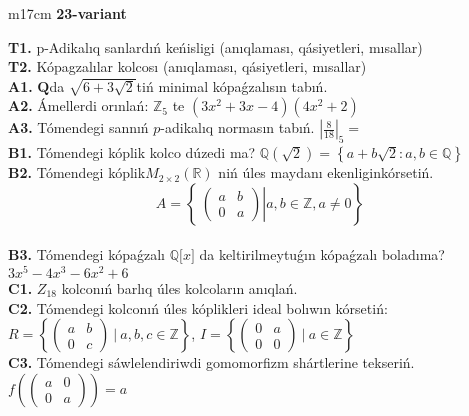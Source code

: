\documentclass{article}
\begin{document}
\begin{tabular}{m{17cm}}
\textbf{23-variant}
\newline

\textbf{T1.} p-Adikalıq sanlardıń keńisligi (anıqlaması, qásiyetleri, mısallar) \\
\textbf{T2.} Kópagzalılar kolcosı (anıqlaması, qásiyetleri, mısallar) \\
\textbf{A1.} \(\mathbf{Q}\)da \(\sqrt{6 + 3\sqrt{2}}\)tiń minimal kópaǵzalısın tabıń. \\
\textbf{A2.} Ámellerdi orınlań: \(\mathbb{Z}_{5}\) te \(\left( 3x^{2} + 3x - 4 \right)\left( 4x^{2} + 2 \right)\) \\
\textbf{A3.} Tómendegi sannıń \(p\)-adikalıq normasın tabıń. \(|\frac{8}{18}|_{5} =\) \\
\textbf{B1.} Tómendegi kóplik kolco dúzedi ma? \(\mathbb{Q}\left( \sqrt{2} \right) = \left\{ a + b\sqrt{2}:a,b \in \mathbb{Q} \right\}\) \\
\textbf{B2.} Tómendegi kóplik\(M_{2 \times 2}\left( \mathbb{R} \right)\) niń úles maydanı ekenliginkórsetiń.
\[A = \left\{ \left. \ \begin{pmatrix}
a & b \\
0 & a
\end{pmatrix} \right|a,b\mathbb{\in Z},a \neq 0 \right\}\] \\
\textbf{B3.} Tómendegi kópaǵzalı \(\mathbb{Q\lbrack}x\rbrack\) da keltirilmeytuǵın kópaǵzalı boladıma? \(3x^{5} - 4x^{3} - 6x^{2} + 6\) \\
\textbf{C1.} \(Z_{18}\) kolconıń barlıq úles kolcoların anıqlań. \\
\textbf{C2.} Tómendegi kolconıń úles kóplikleri ideal bolıwın kórsetiń:
\(R = \left\{ \begin{pmatrix}
a & b \\
0 & c
\end{pmatrix}\ |\ a,b,c \in \mathbb{Z} \right\}\), \(I = \left\{ \begin{pmatrix}
0 & a \\
0 & 0
\end{pmatrix}\ |\ a \in \mathbb{Z} \right\}\) \\
\textbf{C3.} Tómendegi sáwlelendiriwdi gomomorfizm shártlerine tekseriń. \(f\left( \begin{pmatrix}
a & 0 \\
0 & a
\end{pmatrix} \right) = a\) \\

\end{tabular}
\vspace{1cm}
\end{document}
